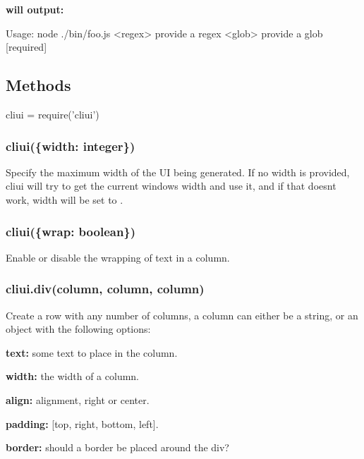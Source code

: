 {\bfseries will output\+:}


\begin{DoxyCode}
Usage: node ./bin/foo.js
  <regex>  provide a regex
  <glob>   provide a glob          [required]
\end{DoxyCode}


\subsection*{Methods}


\begin{DoxyCode}
cliui = require('cliui')
\end{DoxyCode}


\subsubsection*{cliui(\{width\+: integer\})}

Specify the maximum width of the UI being generated. If no width is provided, cliui will try to get the current window\textquotesingle{}s width and use it, and if that doesn\textquotesingle{}t work, width will be set to {}.

\subsubsection*{cliui(\{wrap\+: boolean\})}

Enable or disable the wrapping of text in a column.

\subsubsection*{cliui.\+div(column, column, column)}

Create a row with any number of columns, a column can either be a string, or an object with the following options\+:


\begin{DoxyItemize}
\item {\bfseries text\+:} some text to place in the column.
\item {\bfseries width\+:} the width of a column.
\item {\bfseries align\+:} alignment, {\ttfamily right} or {\ttfamily center}.
\item {\bfseries padding\+:} {\ttfamily \mbox{[}top, right, bottom, left\mbox{]}}.
\item {\bfseries border\+:} should a border be placed around the div?
\end{DoxyItemize}


